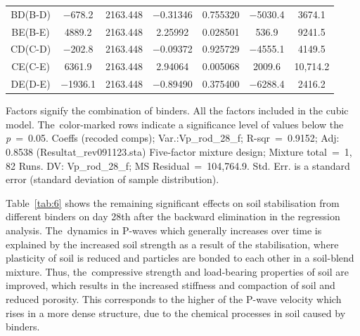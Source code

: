 \documentclass[materials,article,accept,pdftex,moreauthors]{Definitions/mdpi}
\begin{document}
\begin{table}[H]
\begin{tabularx}{\textwidth}{CCCCCCC}
        BD(B-D) & $-$678.2 & 2163.448 & $-$0.31346 & 0.755320 & $-$5030.4 & 3674.1 \\ 
         BE(B-E) & 4889.2 & 2163.448 & 2.25992 & 0.028501 & 536.9 & 9241.5 \\ 
        CD(C-D) & $-$202.8 & 2163.448 & $-$0.09372 & 0.925729 & $-$4555.1 & 4149.5 \\ 
         CE(C-E) & 6361.9 & 2163.448 & 2.94064 & 0.005068 & 2009.6 & 10,714.2 \\ 
        DE(D-E) & $-$1936.1 & 2163.448 & $-$0.89490 & 0.375400 & $-$6288.4 & 2416.2 \\ \bottomrule
\end{tabularx}
\footnotesize{Factors signify the combination of binders. All the factors included in the cubic model. The~color-marked rows indicate a significance level of values below the \emph{p}~=~0.05. Coeffs (recoded comps); Var.:Vp\_rod\_28\_f; R-sqr~=~0.9152; Adj: 0.8538 (Resultat\_rev091123.sta) Five-factor mixture design; Mixture total~=~1, 82 Runs. DV: Vp\_rod\_28\_f; MS Residual~=~104,764.9. Std. Err. is a standard error (standard deviation of sample distribution).}
\end{table}


\newpage
Table~\ref{tab:6} shows the remaining significant effects on soil stabilisation from different binders on day {28}th after the backward elimination in the regression analysis. The~dynamics in P-waves which generally increases over time is explained by the increased soil strength as a result of the stabilisation, where plasticity of soil is reduced and particles are bonded to each other in a soil-blend mixture. Thus, the~compressive strength and load-bearing properties of soil are improved, which results in the increased stiffness and compaction of soil and reduced porosity. This corresponds to the higher of the P-wave velocity which rises in a more dense structure, due to the chemical processes in soil caused by binders. 
\end{document}
